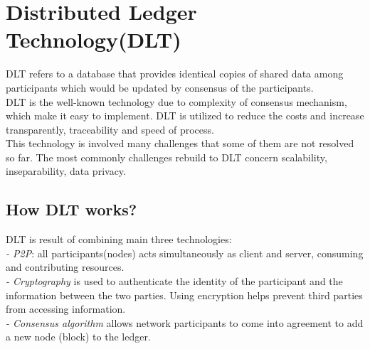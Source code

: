 \section{Distributed Ledger Technology(DLT)} 
DLT refers to a database that provides identical copies of shared data among participants which would be updated by consensus of the participants. \\
DLT is the well-known technology due to complexity of consensus mechanism, which make it easy to implement. 
DLT is utilized to reduce the costs and increase transparently, traceability and speed of process.\\
This technology is involved many challenges that some of  them are not resolved so far. The most commonly challenges rebuild to DLT concern scalability, inseparability, data privacy\cite{Ugarte}. 

\subsection{How DLT works?}
DLT is result of combining main three technologies:\\
\hspace{1cm}\textit{-  P2P}: all participants(nodes) acts simultaneously as client and server, consuming and contributing resources.\\
\hspace{1cm}\textit{- Cryptography} is used to authenticate the identity of the participant and the information between the two parties. Using encryption helps prevent third parties from accessing information. \\
\hspace{1cm}\textit{- Consensus algorithm} allows network participants to come into agreement to add a new node (block) to the ledger\cite{Ugarte}.\\
